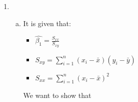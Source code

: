 \documentclass[12pt]{article}
\begin{document}
\begin{enumerate}[1.]
\begin{enumerate}[(a)]
\begin{proof}
                proof continued.
                \begin{align*}
                    \sum_{i=1}^{n} \hat{y_i}e_i &= (n\bar{y}^2 - (n\bar{y}^2 - \hat{\beta_1}^2n\bar{x}^2 + \hat{\beta_1}^2n\bar{x}^2)) \\
                    &= (n\bar{y}^2 - n\bar{y}^2) \\
                    &= 0
                \end{align*}
                \[LHS = 0 = RHS\]   
            \end{proof}
            $\therefore$ It is true that the predicted values $\hat{y_i}$ is completely orthogonal to the residuals $e_i$.
    \end{enumerate}
    \item 
        \begin{enumerate}[(a)]
            \item It is given that:
            \begin{itemize}
                \item $\hat{\beta_1} = \frac{S_{xx}}{S_{xy}}$
                \item $S_{xy} = \sum_{i = 1}^{n} (x_i - \bar{x})(y_i - \bar{y})$
                \item $S_{xx} = \sum_{i = 1}^{n} (x_i - \bar{x})^2$
            \end{itemize}
            We want to show that 
            

\end{enumerate}
\end{enumerate}
\end{document}
